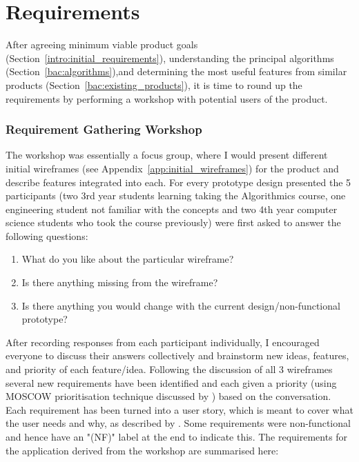 \chapter{Requirements}

After agreeing minimum viable product goals (Section~\ref{intro:initial_requirements}), understanding the principal algorithms (Section~\ref{bac:algorithms}),and determining the most useful features from similar products (Section~\ref{bac:existing_products}), it is time to round up the requirements by performing a workshop with potential users of the product.

\subsection{Requirement Gathering Workshop}
\label{intro:requirement_gathering_workshop}

The workshop was essentially a focus group, where I would present different initial wireframes (see Appendix~\ref{app:initial_wireframes}) for the product and describe features integrated into each.  For every prototype design presented the 5 participants (two 3rd year students learning taking the Algorithmics course, one engineering student not familiar with the concepts and two 4th year computer science students who took the course previously) were first asked to answer the following questions:
\begin{enumerate}
  \item What do you like about the particular wireframe?
  \item Is there anything missing from the wireframe?
  \item Is there anything you would change with the current design/non-functional prototype?
\end{enumerate}

After recording responses from each participant individually, I encouraged everyone to discuss their answers collectively and brainstorm new ideas, features, and priority of each feature/idea. Following the discussion of all 3 wireframes several new requirements have been identified and each given a priority (using MOSCOW prioritisation technique discussed by \cite{mind_tools}) based on the conversation. Each requirement has been turned into a user story, which is meant to cover what the user needs and why, as described by \cite{Rehkopf}. Some requirements were non-functional and hence have an "(NF)" label at the end to indicate this. The requirements for the application derived from the workshop are summarised here:

